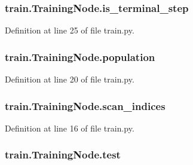 \subsubsection[{\texorpdfstring{is\+\_\+terminal\+\_\+step}{is_terminal_step}}]{\setlength{\rightskip}{0pt plus 5cm}train.\+Training\+Node.\+is\+\_\+terminal\+\_\+step}\hypertarget{classtrain_1_1_training_node_aa17107636d9a2df25960aa1076d9b987}{}\label{classtrain_1_1_training_node_aa17107636d9a2df25960aa1076d9b987}


Definition at line 25 of file train.\+py.

\subsubsection[{\texorpdfstring{population}{population}}]{\setlength{\rightskip}{0pt plus 5cm}train.\+Training\+Node.\+population}\hypertarget{classtrain_1_1_training_node_a73a06dfa3230d4f26cc9767488b30385}{}\label{classtrain_1_1_training_node_a73a06dfa3230d4f26cc9767488b30385}


Definition at line 20 of file train.\+py.

\subsubsection[{\texorpdfstring{scan\+\_\+indices}{scan_indices}}]{\setlength{\rightskip}{0pt plus 5cm}train.\+Training\+Node.\+scan\+\_\+indices}\hypertarget{classtrain_1_1_training_node_adc0b51385828f502a6394aadc342eb56}{}\label{classtrain_1_1_training_node_adc0b51385828f502a6394aadc342eb56}


Definition at line 16 of file train.\+py.

\subsubsection[{\texorpdfstring{test}{test}}]{\setlength{\rightskip}{0pt plus 5cm}train.\+Training\+Node.\+test}\hypertarget{classtrain_1_1_training_node_a26350a860e1c0aaf7653da42c55fa93a}{}\label{classtrain_1_1_training_node_a26350a860e1c0aaf7653da42c55fa93a}


